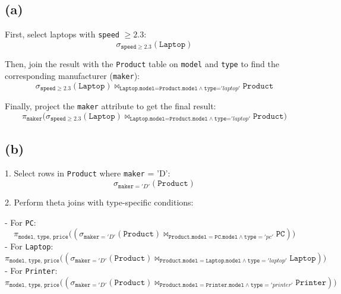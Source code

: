 \documentclass{article}
\begin{document}
\subsection*{(a)}
First, select laptops with \texttt{speed} $\geq 2.3$:
$$
    \sigma_{\texttt{speed} \geq 2.3}(\texttt{Laptop})
$$

Then, join the result with the \texttt{Product} table on \texttt{model} and \texttt{type} to find the corresponding manufacturer (\texttt{maker}):
$$
    \sigma_{\texttt{speed} \geq 2.3}(\texttt{Laptop}) \bowtie_{\texttt{Laptop.model=Product.model}\land\texttt{type=}'laptop'} \texttt{Product}
$$

Finally, project the \texttt{maker} attribute to get the final result:
$$
    \pi_{\texttt{maker}} \bigg( \sigma_{\texttt{speed} \geq 2.3}(\texttt{Laptop}) \bowtie_{\texttt{Laptop.model=Product.model}\land\texttt{type=}'laptop'} \texttt{Product} \bigg)
$$

\subsection*{(b)}
1. Select rows in \texttt{Product} where \texttt{maker} = 'D':
$$
    \sigma_{\texttt{maker} = 'D'}(\texttt{Product})
$$

2. Perform theta joins with type-specific conditions:

- For \texttt{PC}:
$$
    \pi_{\texttt{model, type, price}} \Big(
    (\sigma_{\texttt{maker} = 'D'}(\texttt{Product}) \bowtie_{\texttt{Product.model} = \texttt{PC.model} \land \texttt{type} = 'pc'} \texttt{PC})
    \Big)
$$
- For \texttt{Laptop}:
$$
    \pi_{\texttt{model, type, price}} \Big(
    (\sigma_{\texttt{maker} = 'D'}(\texttt{Product}) \bowtie_{\texttt{Product.model} = \texttt{Laptop.model} \land \texttt{type} = 'laptop'} \texttt{Laptop})
    \Big)
$$
- For \texttt{Printer}:
$$
    \pi_{\texttt{model, type, price}} \Big(
    (\sigma_{\texttt{maker} = 'D'}(\texttt{Product}) \bowtie_{\texttt{Product.model} = \texttt{Printer.model} \land \texttt{type} = 'printer'} \texttt{Printer})
    \Big)
$$
\end{document}
